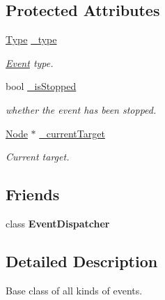 \subsection*{Protected Attributes}
\begin{DoxyCompactItemize}
\item 
\mbox{\label{classEvent_a69d75d075ab72974a8711c0c915503e0}} 
\hyperlink{classEvent_a2abf13b5be49315e9e362af02029f058}{Type} \hyperlink{classEvent_a69d75d075ab72974a8711c0c915503e0}{\+\_\+type}
\begin{DoxyCompactList}\small\item\em \hyperlink{classEvent}{Event} type. \end{DoxyCompactList}\item 
\mbox{\label{classEvent_a2b6b28bb85da5fc51be4d005329cbfa1}} 
bool \hyperlink{classEvent_a2b6b28bb85da5fc51be4d005329cbfa1}{\+\_\+is\+Stopped}
\begin{DoxyCompactList}\small\item\em whether the event has been stopped. \end{DoxyCompactList}\item 
\mbox{\label{classEvent_a4c5a67318268eaeef8f3deaf3a2b7250}} 
\hyperlink{classNode}{Node} $\ast$ \hyperlink{classEvent_a4c5a67318268eaeef8f3deaf3a2b7250}{\+\_\+current\+Target}
\begin{DoxyCompactList}\small\item\em Current target. \end{DoxyCompactList}\end{DoxyCompactItemize}
\subsection*{Friends}
\begin{DoxyCompactItemize}
\item 
\mbox{\label{classEvent_a7de0ed02fc316d9e73b7eb3def69c105}} 
class {\bfseries Event\+Dispatcher}
\end{DoxyCompactItemize}


\subsection{Detailed Description}
Base class of all kinds of events. 

